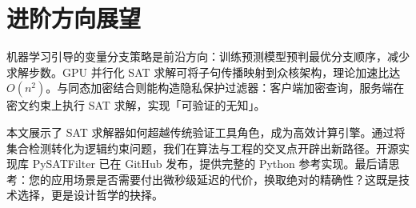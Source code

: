 \chapter{进阶方向展望}
机器学习引导的变量分支策略是前沿方向：训练预测模型预判最优分支顺序，减少求解步数。GPU 并行化 SAT 求解可将子句传播映射到众核架构，理论加速比达 $O(n^2)$。与同态加密结合则能构造隐私保护过滤器：客户端加密查询，服务端在密文约束上执行 SAT 求解，实现「可验证的无知」。\par
本文展示了 SAT 求解器如何超越传统验证工具角色，成为高效计算引擎。通过将集合检测转化为逻辑约束问题，我们在算法与工程的交叉点开辟出新路径。开源实现库 PySATFilter 已在 GitHub 发布，提供完整的 Python 参考实现。最后请思考：您的应用场景是否需要付出微秒级延迟的代价，换取绝对的精确性？这既是技术选择，更是设计哲学的抉择。\par
